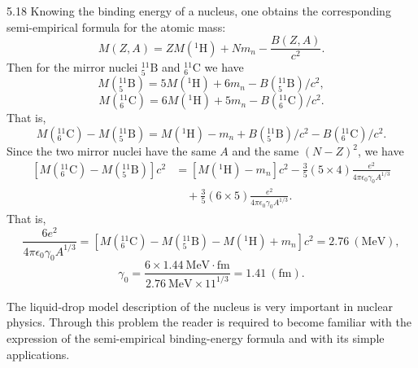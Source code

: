 \begin{solution}{5.18}
Knowing the binding energy of a nucleus, one obtains the corresponding semi-empirical formula for
the atomic mass:
\begin{equation*}
M(Z,A)=ZM({}^{1}\mathrm{H})+Nm_n-\frac{B(Z,A)}{c^2}.
\end{equation*}
Then for the mirror nuclei ${}^{11}_{5}\mathrm{B}$ and ${}^{11}_{6}\mathrm{C}$ we have
\begin{equation*}
M({}^{11}_{5}\mathrm{B})=5M({}^{1}\mathrm{H})+6m_n-B({}^{11}_{5}\mathrm{B})/c^2,
\end{equation*}
\begin{equation*}
M({}^{11}_{6}\mathrm{C})=6M({}^{1}\mathrm{H})+5m_n-B({}^{11}_{6}\mathrm{C})/c^2.
\end{equation*}
That is,
\begin{equation*}
M({}^{11}_{6}\mathrm{C})-M({}^{11}_{5}\mathrm{B})=M({}^{1}\mathrm{H})-m_n
+B({}^{11}_{5}\mathrm{B})/c^2-B({}^{11}_{6}\mathrm{C})/c^2.
\end{equation*}
Since the two mirror nuclei have the same $A$ and the same $(N-Z)^2$, we have
\begin{align*}
\left[M({}^{11}_{6}\mathrm{C})-M({}^{11}_{5}\mathrm{B})\right]c^2
&=\left[M({}^{1}\mathrm{H})-m_n\right]c^2
-\frac{3}{5}(5\times 4)\frac{e^2}{4\pi\epsilon_0\gamma_0A^{1/3}}\\
&\quad+\frac{3}{5}(6\times 5)\frac{e^2}{4\pi\epsilon_0\gamma_0A^{1/3}}.
\end{align*}
That is,
\begin{equation*}
\frac{6e^2}{4\pi\epsilon_0\gamma_0A^{1/3}}
=\left[M({}^{11}_{6}\mathrm{C})-M({}^{11}_{5}\mathrm{B})-M({}^{1}\mathrm{H})+m_n\right]c^2
=2.76\ (\mathrm{MeV}),
\end{equation*}
\begin{equation*}
\gamma_0=\frac{6\times 1.44\ \mathrm{MeV}\cdot\mathrm{fm}}{2.76\ \mathrm{MeV}\times 11^{1/3}}
=1.41\ (\mathrm{fm}).
\end{equation*}

\begin{commentary}
The liquid-drop model description of the nucleus is very important in nuclear physics. Through
this problem the reader is required to become familiar with the expression of the semi-empirical
binding-energy formula and with its simple applications.
\end{commentary}
\end{solution}


